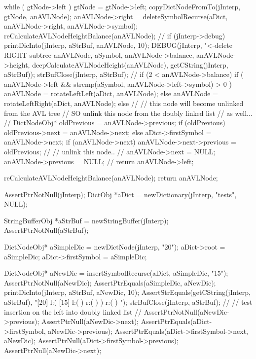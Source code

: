 {{{      while ( gtNode->left ) {
        gtNode = gtNode->left;
      }
      copyDictNodeFromTo(jInterp, gtNode, anAVLNode);
      anAVLNode->right =
        deleteSymbolRecurse(aDict, anAVLNode->right, anAVLNode->symbol);
      reCalculateAVLNodeHeightBalance(anAVLNode);
      //
      if (jInterp->debug) {
        printDicInto(jInterp, aStrBuf, anAVLNode, 10);
        DEBUG(jInterp, "<-delete RIGHT subtree %
            anAVLNode, aSymbol, anAVLNode->balance,
            anAVLNode->height, deepCalculateAVLNodeHeight(anAVLNode),
            getCString(jInterp, aStrBuf));
        strBufClose(jInterp, aStrBuf);
      }
      //
      if (2 < anAVLNode->balance) {
        if (
          anAVLNode->left &&
          strcmp(aSymbol, anAVLNode->left->symbol) > 0
          ) {
          anAVLNode = rotateLeftLeft(aDict, anAVLNode);
        } else {
          anAVLNode = rotateLeftRight(aDict, anAVLNode);
        }
      }
    } else {
      //
      // this node will become unlinked from the AVL tree
      // SO unlink this node from the doubly linked list
      // as well...
      //
      DictNodeObj* oldPrevious           = anAVLNode->previous;
      if (oldPrevious) oldPrevious->next = anAVLNode->next;
      else aDict->firstSymbol            = anAVLNode->next;
      if (anAVLNode->next) {
        anAVLNode->next->previous        = oldPrevious;
      }
      //
      // unlink this node..
      //
      anAVLNode->next     = NULL;
      anAVLNode->previous = NULL;
      //
      return anAVLNode->left;
    }
  }

  reCalculateAVLNodeHeightBalance(anAVLNode);
  return anAVLNode;
}
\stopCCode

\startCTest
  AssertPtrNotNull(jInterp);
  DictObj *aDict = newDictionary(jInterp, "tests", NULL);

  StringBufferObj *aStrBuf = newStringBuffer(jInterp);
  AssertPtrNotNull(aStrBuf);
  
  DictNodeObj* aSimpleDic = newDictNode(jInterp, "20");
  aDict->root             = aSimpleDic;
  aDict->firstSymbol      = aSimpleDic;

  DictNodeObj* aNewDic = insertSymbolRecurse(aDict, aSimpleDic, "15");
  AssertPtrNotNull(aNewDic);
  AssertPtrEquals(aSimpleDic, aNewDic);
  printDicInto(jInterp, aStrBuf, aNewDic, 10);
  AssertStrEquals(getCString(jInterp, aStrBuf),
  "[20] l:( [15] l:(  ) r:(  )  ) r:(  ) ");
  strBufClose(jInterp, aStrBuf);
  //
  // test insertion on the left into doubly linked list
  //
  AssertPtrNotNull(aNewDic->previous);
  AssertPtrNull(aNewDic->next);
  AssertPtrEquals(aDict->firstSymbol, aNewDic->previous);
  AssertPtrEquals(aDict->firstSymbol->next, aNewDic);
  AssertPtrNull(aDict->firstSymbol->previous);
  AssertPtrNull(aNewDic->next);

